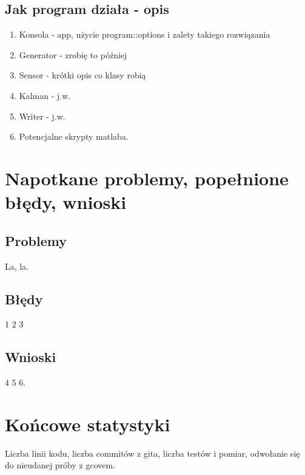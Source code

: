 \documentclass{article}
\begin{document}
	\subsection{Jak program działa - opis}
	\begin{enumerate}
		\item Konsola - app, użycie program::options i zalety takiego rozwiązania
		\item Generator - zrobię to później
		\item Sensor - krótki opis co klasy robią
		\item Kalman - j.w.
		\item Writer - j.w.
		\item Potencjalne skrypty matlaba.
	\end{enumerate}
	
	\section{Napotkane problemy, popełnione błędy, wnioski}
	
	\subsection{Problemy}
	La, la.
	\subsection{Błędy}
	1 2 3
	\subsection{Wnioski}
 	4 5 6.
 	
 	\section{Końcowe statystyki}
 	Liczba linii kodu, liczba commitów z gita, liczba testów i pomiar, odwołanie się do nieudanej próby z gcovem.
 	
 
  
\end{document}
